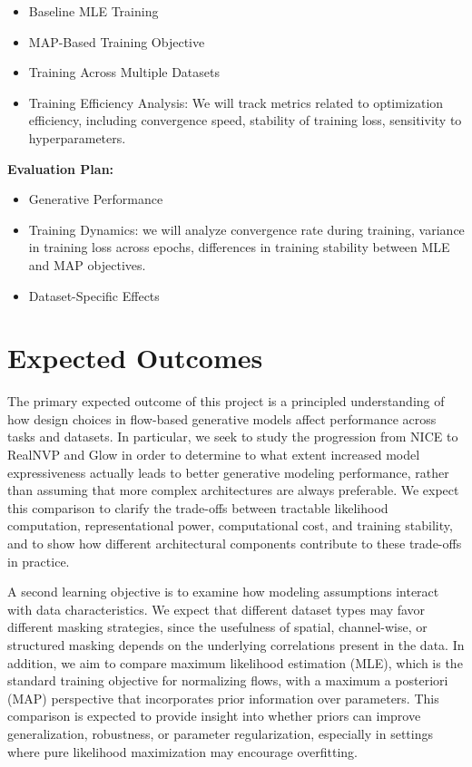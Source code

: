 \documentclass{article}
\begin{document}
\begin{itemize}
\item Baseline MLE Training
\item MAP-Based Training Objective
\item Training Across Multiple Datasets
\item Training Efficiency Analysis: We will track metrics related to optimization efficiency, including convergence speed, stability of training loss, sensitivity to hyperparameters.
\end{itemize}


\textbf{Evaluation Plan:} 
\begin{itemize}
\item Generative Performance
\item Training Dynamics: we will analyze convergence rate during training, variance in training loss across epochs, differences in training stability between MLE and MAP objectives.

\item Dataset-Specific Effects
\end{itemize}

\section{Expected Outcomes}
\noindent The primary expected outcome of this project is a principled understanding of how design choices in flow-based generative models affect performance across tasks and datasets. In particular, we seek to study the progression from NICE to RealNVP and Glow in order to determine to what extent increased model expressiveness actually leads to better generative modeling performance, rather than assuming that more complex architectures are always preferable. We expect this comparison to clarify the trade-offs between tractable likelihood computation, representational power, computational cost, and training stability, and to show how different architectural components contribute to these trade-offs in practice.

\noindent A second learning objective is to examine how modeling assumptions interact with data characteristics. We expect that different dataset types may favor different masking strategies, since the usefulness of spatial, channel-wise, or structured masking depends on the underlying correlations present in the data. In addition, we aim to compare maximum likelihood estimation (MLE), which is the standard training objective for normalizing flows, with a maximum a posteriori (MAP) perspective that incorporates prior information over parameters. This comparison is expected to provide insight into whether priors can improve generalization, robustness, or parameter regularization, especially in settings where pure likelihood maximization may encourage overfitting.
\end{document}
